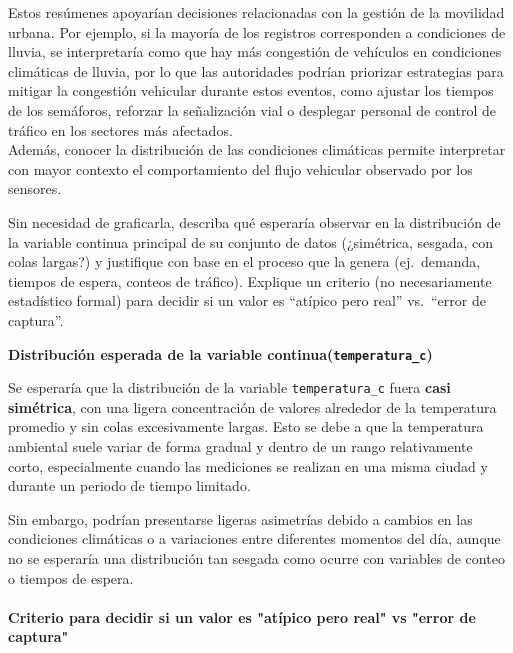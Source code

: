 \documentclass[11pt]{article}
\begin{document}
Estos resúmenes apoyarían decisiones relacionadas con la gestión de la movilidad urbana. Por ejemplo, si la mayoría de los registros corresponden a condiciones de lluvia, se interpretaría como que hay más congestión de vehículos en condiciones climáticas de lluvia, por lo que las autoridades podrían priorizar estrategias para mitigar la congestión vehicular durante estos eventos, como ajustar los tiempos de los semáforos, reforzar la señalización vial o desplegar personal de control de tráfico en los sectores más afectados. \\ Además, conocer la distribución de las condiciones climáticas permite interpretar con mayor contexto el comportamiento del flujo vehicular observado por los sensores.\\

\begin{pregunta}
Sin necesidad de graficarla, describa qué esperaría observar en la distribución de la variable continua principal de su conjunto de datos (¿simétrica, sesgada, con colas largas?) y justifique con base en el proceso que la genera (ej.\ demanda, tiempos de espera, conteos de tráfico). Explique un criterio (no necesariamente estadístico formal) para decidir si un valor es ``atípico pero real'' vs.\ ``error de captura''. 
\end{pregunta}

\textbf{Distribución esperada de la variable continua(\texttt{temperatura\_c})}

Se esperaría que la distribución de la variable \texttt{temperatura\_c} fuera \textbf{casi simétrica}, con una ligera concentración de valores alrededor de la temperatura promedio y sin colas excesivamente largas. Esto se debe a que la temperatura ambiental suele variar de forma gradual y dentro de un rango relativamente corto, especialmente cuando las mediciones se realizan en una misma ciudad y durante un periodo de tiempo limitado.

Sin embargo, podrían presentarse ligeras asimetrías debido a cambios en las condiciones climáticas o a variaciones entre diferentes momentos del día, aunque no se esperaría una distribución tan sesgada como ocurre con variables de conteo o tiempos de espera. \\ \\
\textbf{Criterio para decidir si un valor es "atípico pero real" vs "error de captura"}
\end{document}
